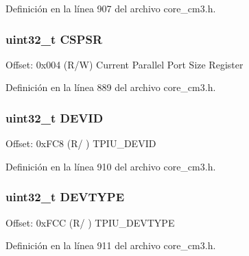Definición en la línea 907 del archivo core\+\_\+cm3.\+h.

\subsubsection[{\texorpdfstring{C\+S\+P\+SR}{CSPSR}}]{ uint32\+\_\+t C\+S\+P\+SR}\hypertarget{struct_t_p_i___type_a473c1ca66cec890b536d9c9a13a2d8c2}{}\label{struct_t_p_i___type_a473c1ca66cec890b536d9c9a13a2d8c2}
Offset\+: 0x004 (R/W) Current Parallel Port Size Register 

Definición en la línea 889 del archivo core\+\_\+cm3.\+h.

\subsubsection[{\texorpdfstring{D\+E\+V\+ID}{DEVID}}]{ uint32\+\_\+t D\+E\+V\+ID}\hypertarget{struct_t_p_i___type_ac427ef592ac98a4e2d4b04d76ce02a4e}{}\label{struct_t_p_i___type_ac427ef592ac98a4e2d4b04d76ce02a4e}
Offset\+: 0x\+F\+C8 (R/ ) T\+P\+I\+U\+\_\+\+D\+E\+V\+ID 

Definición en la línea 910 del archivo core\+\_\+cm3.\+h.

\subsubsection[{\texorpdfstring{D\+E\+V\+T\+Y\+PE}{DEVTYPE}}]{ uint32\+\_\+t D\+E\+V\+T\+Y\+PE}\hypertarget{struct_t_p_i___type_a67888dcdd12f305556012ba4c39cea19}{}\label{struct_t_p_i___type_a67888dcdd12f305556012ba4c39cea19}
Offset\+: 0x\+F\+CC (R/ ) T\+P\+I\+U\+\_\+\+D\+E\+V\+T\+Y\+PE 

Definición en la línea 911 del archivo core\+\_\+cm3.\+h.


